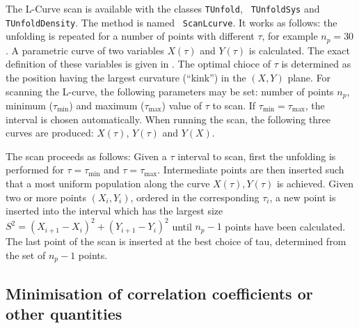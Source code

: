 \documentclass[12pt]{article}
\begin{document}
The L-Curve scan is available with the classes {\tt TUnfold}, {\tt
  TUnfoldSys} and {\tt TUnfoldDensity}. The method is named {\tt
  ScanLcurve}. It works as follows: the unfolding is repeated for a
number of points with different $\tau$, 
for example $n_p=30$. A parametric curve of two
variables $X(\tau)$ and $Y(\tau)$ is calculated.
The exact definition of these variables is given in 
\cite{Schmitt:2012kp}. The optimal chioce of $\tau$ is 
determined as the position having the largest curvature (``kink'') in
the $(X,Y)$ plane.
For scanning the L-curve, the following parameters may be set: number
of points $n_p$, minimum ($\tau_{\min{}}$) and maximum
($\tau_{\max{}}$) value of $\tau$ to scan. If
$\tau_{\min{}}=\tau_{\max{}}$, the interval is chosen
automatically. When running the scan, the following three curves are
produced: $X(\tau)$, $Y(\tau)$ and $Y(X)$.

The scan proceeds as follows: Given a $\tau$ interval to
scan, first the unfolding is performed for $\tau=\tau_{\min{}}$ and
$\tau=\tau_{\max{}}$. Intermediate points are then inserted such that
a most uniform population along the curve $X(\tau),Y(\tau)$ is
achieved. Given two or more
points $(X_i,Y_i)$, ordered in the corresponding $\tau_i$, a new point is
inserted into the interval which has the largest size $S^2=(X_{i+1}-X_i)^2+(Y_{i+1}-Y_i)^2$ until
$n_p-1$ points have been calculated.
The last point of the scan is inserted at the best choice of tau, determined
from the set of $n_p-1$ points.

\subsection{Minimisation of correlation coefficients or other quantities}
\end{document}
